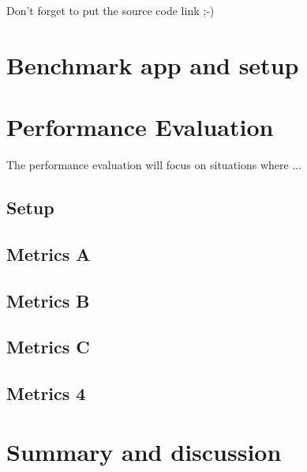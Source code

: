 
Don't forget to put the source code link ;-) 

\chapter{Benchmark app and setup}
\label{ch:eval:benchmark-app}


\chapter{Performance Evaluation}

The performance evaluation will focus on situations where ...

\section{Setup}
\label{sec:experimental-setup}


\section{Metrics A}
\label{sec:eval1}


\section{Metrics B}
\label{sec:eval2}


\section{Metrics C}
\label{sec:eval3}


\section{Metrics 4}
\label{sec:eval4}


\chapter{Summary and discussion}

